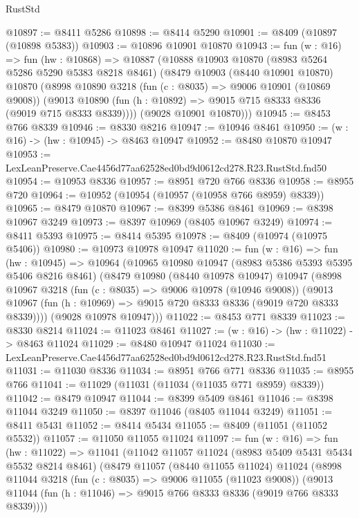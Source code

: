 \begin{lexlean}{RustStd}
\begin{coremodule}
@10897 := @8411 @5286
@10898 := @8414 @5290
@10901 := @8409 (@10897 (@10898 @5383))
@10903 := @10896 @10901 @10870
@10943 := fun (w : @16) =>
  fun (hw : @10868) =>
  @10887
    (@10888
      @10903
      @10870
      (@8983 @5264 @5286 @5290 @5383 @8218 @8461)
      (@8479
        @10903
        (@8440 @10901 @10870)
        @10870
        (@8998
          @10890
          @3218
          (fun (c : @8035) => @9006 @10901 (@10869 @9008))
          (@9013 @10890 (fun (h : @10892) => @9015 @715 @8333 @8336 (@9019 @715 @8333 @8339))))
        (@9028 @10901 @10870)))
@10945 := @8453 @766 @8339
@10946 := @8330 @8216
@10947 := @10946 @8461
@10950 := (w : @16) -> (hw : @10945) -> @8463 @10947
@10952 := @8480 @10870 @10947
@10953 := LexLeanPreserve.Cae4456d77aa62528ed0bd9d0612cd278.R23.RustStd.fnd50
@10954 := @10953 @8336
@10957 := @8951 @720 @766 @8336
@10958 := @8955 @720
@10964 := @10952 (@10954 (@10957 (@10958 @766 @8959) @8339))
@10965 := @8479 @10870
@10967 := @8399 @5386 @8461
@10969 := @8398 @10967 @3249
@10973 := @8397 @10969 (@8405 @10967 @3249)
@10974 := @8411 @5393
@10975 := @8414 @5395
@10978 := @8409 (@10974 (@10975 @5406))
@10980 := @10973 @10978 @10947
@11020 := fun (w : @16) =>
  fun (hw : @10945) =>
  @10964
    (@10965
      @10980
      @10947
      (@8983 @5386 @5393 @5395 @5406 @8216 @8461)
      (@8479
        @10980
        (@8440 @10978 @10947)
        @10947
        (@8998
          @10967
          @3218
          (fun (c : @8035) => @9006 @10978 (@10946 @9008))
          (@9013 @10967 (fun (h : @10969) => @9015 @720 @8333 @8336 (@9019 @720 @8333 @8339))))
        (@9028 @10978 @10947)))
@11022 := @8453 @771 @8339
@11023 := @8330 @8214
@11024 := @11023 @8461
@11027 := (w : @16) -> (hw : @11022) -> @8463 @11024
@11029 := @8480 @10947 @11024
@11030 := LexLeanPreserve.Cae4456d77aa62528ed0bd9d0612cd278.R23.RustStd.fnd51
@11031 := @11030 @8336
@11034 := @8951 @766 @771 @8336
@11035 := @8955 @766
@11041 := @11029 (@11031 (@11034 (@11035 @771 @8959) @8339))
@11042 := @8479 @10947
@11044 := @8399 @5409 @8461
@11046 := @8398 @11044 @3249
@11050 := @8397 @11046 (@8405 @11044 @3249)
@11051 := @8411 @5431
@11052 := @8414 @5434
@11055 := @8409 (@11051 (@11052 @5532))
@11057 := @11050 @11055 @11024
@11097 := fun (w : @16) =>
  fun (hw : @11022) =>
  @11041
    (@11042
      @11057
      @11024
      (@8983 @5409 @5431 @5434 @5532 @8214 @8461)
      (@8479
        @11057
        (@8440 @11055 @11024)
        @11024
        (@8998
          @11044
          @3218
          (fun (c : @8035) => @9006 @11055 (@11023 @9008))
          (@9013 @11044 (fun (h : @11046) => @9015 @766 @8333 @8336 (@9019 @766 @8333 @8339))))

\end{coremodule}
\end{lexlean}
